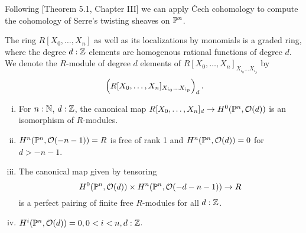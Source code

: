 
Following \cite{Hartshorne}[Theorem 5.1, Chapter III] we can apply \v{C}ech cohomology to compute
the cohomology of Serre's twisting sheaves on $\mathbb{P}^n$.

\begin{definition}
  The ring $R[X_0,\dots,X_n]$ as well as its localizations by monomials is a graded ring, where the degree $d:\mathbb{Z}$ elements are homogenous rational functions of degree $d$.
  We denote the $R$-module of degree $d$ elements of $R[X_0,\dots,X_n]_{X_{i_0}\dots X_{i_p}}$ by
  \[
    \left(R[X_0,\dots,X_n]_{X_{i_0}\dots X_{i_p}}\right)_d
    \rlap{.}
  \]
\end{definition}

\begin{theorem}
  \begin{enumerate}[(i)]
  \item For $n:\mathbb{N}$, $d:\mathbb{Z}$, the canonical map $R[X_0,\dots,X_n]_d\to H^0(\mathbb{P}^n,\mathcal O(d))$ is an isomorphism of $R$-modules.
  \item $H^n(\mathbb{P}^n,\mathcal O(-n-1))=R$ is free of rank 1 and $H^n(\mathbb{P}^n,\mathcal O(d))=0$ for $d>-n-1$.
  \item The canonical map given by tensoring
    \[
      H^0(\mathbb{P}^n,\mathcal O(d)) \times H^n(\mathbb{P}^n,\mathcal O(-d-n-1))\to R
    \]
    is a perfect pairing of finite free $R$-modules for all $d:\mathbb{Z}$.
  \item $H^i(\mathbb{P}^n,\mathcal O(d))=0, 0<i<n, d:\mathbb{Z}$.
  \end{enumerate}
\end{theorem}

